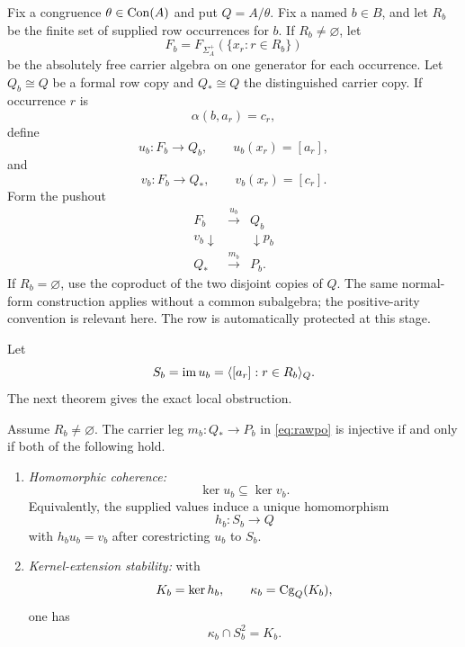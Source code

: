 Fix a congruence $\theta\in\operatorname{Con}(A)$ and put $Q=A/\theta$.  Fix a named $b\in B$, and let $R_b$ be the finite set of supplied row occurrences for $b$.  If $R_b\neq\varnothing$, let
\[
F_b=F_{\Sigma_A^+}(\{x_r:r\in R_b\})
\]
be the absolutely free carrier algebra on one generator for each occurrence.  Let $Q_b\cong Q$ be a formal row copy and $Q_*\cong Q$ the distinguished carrier copy.  If occurrence $r$ is
\[
\alpha(b,a_r)=c_r,
\]
define
\[
u_b:F_b\to Q_b,
\qquad u_b(x_r)=[a_r],
\]
and
\[
v_b:F_b\to Q_*,
\qquad v_b(x_r)=[c_r].
\]
Form the pushout
\begin{equation}\label{eq:rawpo}
\begin{array}{ccc}
F_b & \xrightarrow{u_b} & Q_b\\
{\scriptstyle v_b}\downarrow && \downarrow{\scriptstyle p_b}\\
Q_* & \xrightarrow{m_b} & P_b.
\end{array}
\end{equation}
If $R_b=\varnothing$, use the coproduct of the two disjoint copies of $Q$.
The same normal-form construction applies without a common subalgebra; the
positive-arity convention is relevant here. The row is automatically
protected at this stage.

Let
\[
S_b=\operatorname{im} u_b
=\langle[a_r]:r\in R_b\rangle_Q.
\]
The next theorem gives the exact local obstruction.

\begin{theorem}\label{thm:raw}
Assume $R_b\neq\varnothing$.  The carrier leg $m_b:Q_*\to P_b$ in \eqref{eq:rawpo} is injective if and only if both of the following hold.
\begin{enumerate}[label=(\alph*)]
\item \emph{Homomorphic coherence:}
\[
\ker u_b\subseteq\ker v_b.
\]
Equivalently, the supplied values induce a unique homomorphism
\[
h_b:S_b\to Q
\]
with $h_bu_b=v_b$ after corestricting $u_b$ to $S_b$.
\item \emph{Kernel-extension stability:} with
\[
K_b=\ker h_b,
\qquad
\kappa_b=\operatorname{Cg}_Q(K_b),
\]
one has
\begin{equation}\label{eq:cepcondition}
\kappa_b\cap S_b^2=K_b.
\end{equation}
\end{enumerate}
\end{theorem}

